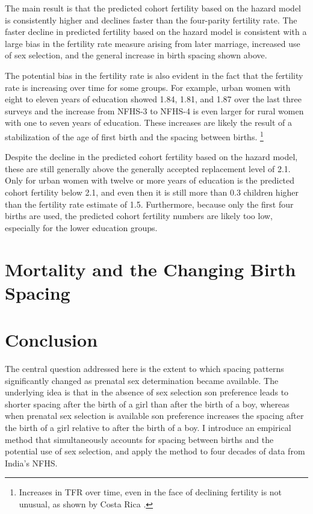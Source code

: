 \documentclass[12pt,letterpaper]{article}
\begin{document}
The main result is that the predicted cohort fertility based on the hazard model is 
consistently higher and declines faster than the four-parity fertility rate.
The faster decline in predicted fertility based on the hazard model is consistent with
a large bias in the fertility rate measure arising from later marriage, increased use of 
sex selection, and the general increase in birth spacing shown above.

The potential bias in the fertility rate is also evident in the fact that the 
fertility rate is increasing over time for some groups.
For example, urban women with eight to eleven years of education showed 1.84, 1.81, and
1.87 over the last three surveys and the increase from NFHS-3 to NFHS-4 is even larger
for rural women with one to seven years of education.
These increases are likely the result of a stabilization of the age of first birth and
the spacing between births.%
\footnote{
Increases in TFR over time, even in the face of declining fertility is not 
unusual, as shown by Costa Rica \citep{Bongaarts1999}.
}

Despite the decline in the predicted cohort fertility based on the hazard model, these 
are still generally above the generally accepted replacement level of 2.1.
Only for urban women with twelve or more years of education is the predicted cohort
fertility below 2.1, and even then it is still more than 0.3 children higher than the 
fertility rate estimate of 1.5.
Furthermore, because only the first four births are used, the predicted cohort fertility
numbers are likely too low, especially for the lower education groups.


\section{Mortality and the Changing Birth Spacing\label{sec:mortality}}









\section{Conclusion\label{sec:conclusion}}


The central question addressed here is the extent to which spacing patterns significantly 
changed as prenatal sex determination became available.
The underlying idea is that in the absence of sex selection son preference leads to shorter 
spacing after the birth of a girl than after the birth of a boy, whereas when prenatal sex 
selection is available son preference increases the spacing after the birth of a girl 
relative to after the birth of a boy.
I introduce an empirical method that simultaneously accounts for spacing between births 
and the potential use of sex selection, and apply the method to four decades of data 
from India's NFHS.
\end{document}
